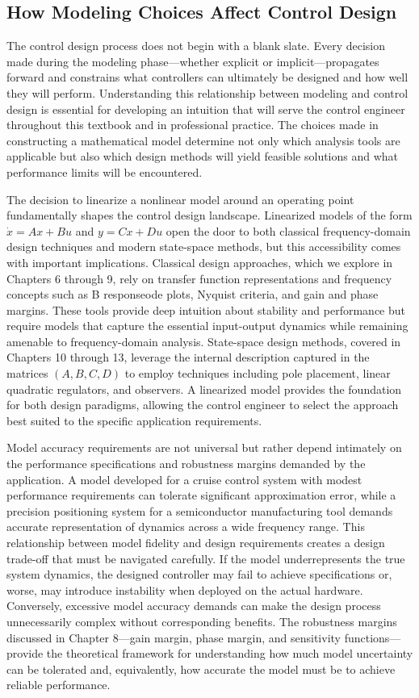 \subsection{How Modeling Choices Affect Control Design}

The control design process does not begin with a blank slate. Every decision made during the modeling phase—whether explicit or implicit—propagates forward and constrains what controllers can ultimately be designed and how well they will perform. Understanding this relationship between modeling and control design is essential for developing an intuition that will serve the control engineer throughout this textbook and in professional practice. The choices made in constructing a mathematical model determine not only which analysis tools are applicable but also which design methods will yield feasible solutions and what performance limits will be encountered.

The decision to linearize a nonlinear model around an operating point fundamentally shapes the control design landscape. Linearized models of the form $\dot{x} = Ax + Bu$ and $y = Cx + Du$ open the door to both classical frequency-domain design techniques and modern state-space methods, but this accessibility comes with important implications. Classical design approaches, which we explore in Chapters 6 through 9, rely on transfer function representations and frequency concepts such as B responseode plots, Nyquist criteria, and gain and phase margins. These tools provide deep intuition about stability and performance but require models that capture the essential input-output dynamics while remaining amenable to frequency-domain analysis. State-space design methods, covered in Chapters 10 through 13, leverage the internal description captured in the matrices $(A, B, C, D)$ to employ techniques including pole placement, linear quadratic regulators, and observers. A linearized model provides the foundation for both design paradigms, allowing the control engineer to select the approach best suited to the specific application requirements.

Model accuracy requirements are not universal but rather depend intimately on the performance specifications and robustness margins demanded by the application. A model developed for a cruise control system with modest performance requirements can tolerate significant approximation error, while a precision positioning system for a semiconductor manufacturing tool demands accurate representation of dynamics across a wide frequency range. This relationship between model fidelity and design requirements creates a design trade-off that must be navigated carefully. If the model underrepresents the true system dynamics, the designed controller may fail to achieve specifications or, worse, may introduce instability when deployed on the actual hardware. Conversely, excessive model accuracy demands can make the design process unnecessarily complex without corresponding benefits. The robustness margins discussed in Chapter 8—gain margin, phase margin, and sensitivity functions—provide the theoretical framework for understanding how much model uncertainty can be tolerated and, equivalently, how accurate the model must be to achieve reliable performance.

